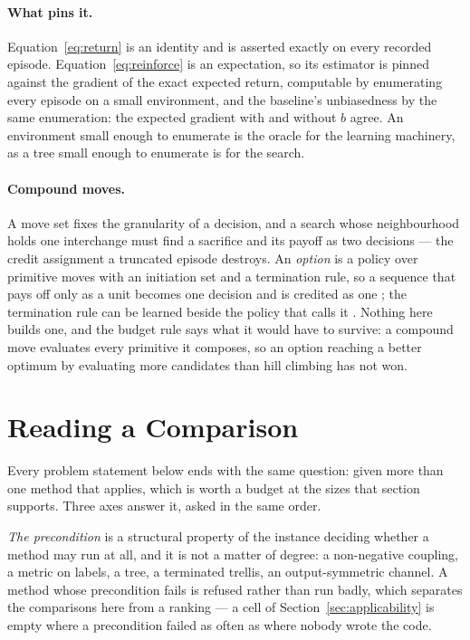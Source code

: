 \documentclass[11pt,a4paper]{article}
\begin{document}
\paragraph{What pins it.}
Equation~\ref{eq:return} is an identity and is asserted exactly on every
recorded episode. Equation~\ref{eq:reinforce} is an expectation, so its
estimator is pinned against the gradient of the exact expected return,
computable by enumerating every episode on a small environment, and the
baseline's unbiasedness by the same enumeration: the expected gradient with and
without $b$ agree. An environment small enough to enumerate is the oracle for
the learning machinery, as a tree small enough to enumerate is for the search.


\paragraph{Compound moves.}
A move set fixes the granularity of a decision, and a search whose
neighbourhood holds one interchange must find a sacrifice and its payoff as two
decisions --- the credit assignment a truncated episode destroys. An
\emph{option} is a policy over primitive moves with an initiation set and a
termination rule, so a sequence that pays off only as a unit becomes one
decision and is credited as one \citep{sutton1999}; the termination rule can be
learned beside the policy that calls it \citep{bacon2017}. Nothing here builds
one, and the budget rule says what it would have to survive: a compound move
evaluates every primitive it composes, so an option reaching a better optimum
by evaluating more candidates than hill climbing has not won.

\section{Reading a Comparison}
\label{sec:comparisons}
Every problem statement below ends with the same question: given more than one
method that applies, which is worth a budget at the sizes that section
supports. Three axes answer it, asked in the same order.

\emph{The precondition} is a structural property of the instance deciding
whether a method may run at all, and it is not a matter of degree: a
non-negative coupling, a metric on labels, a tree, a terminated trellis, an
output-symmetric channel. A method whose precondition fails is refused rather
than run badly, which separates the comparisons here from a ranking --- a cell
of Section~\ref{sec:applicability} is empty where a precondition failed as
often as where nobody wrote the code.
\end{document}
